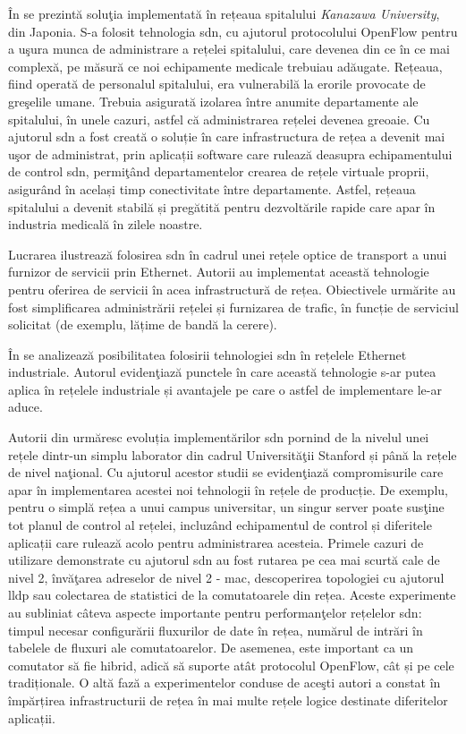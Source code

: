 În \cite{nec2012hospital} se prezintă soluţia implementată în rețeaua spitalului \textit{Kanazawa University}, din Japonia. S-a folosit tehnologia \gls{sdn}, cu ajutorul protocolului OpenFlow pentru a uşura munca de administrare a rețelei spitalului, care devenea din ce în ce mai complexă, pe măsură ce noi echipamente medicale trebuiau adăugate. Rețeaua, fiind operată de personalul spitalului, era vulnerabilă la erorile provocate de greşelile umane. Trebuia asigurată izolarea între anumite departamente ale spitalului, în unele cazuri, astfel că administrarea rețelei devenea greoaie. Cu ajutorul \gls{sdn} a fost creată o soluție în care infrastructura de rețea a devenit mai uşor de administrat, prin aplicații software care rulează deasupra echipamentului de control \gls{sdn}, permiţând departamentelor crearea de rețele virtuale proprii, asigurând în același timp conectivitate între departamente. Astfel, rețeaua spitalului a devenit stabilă și pregătită pentru dezvoltările rapide care apar în industria medicală în zilele noastre.

Lucrarea \cite{bidkar2014field} ilustrează folosirea \gls{sdn} în cadrul unei rețele optice de transport a unui furnizor de servicii prin Ethernet. Autorii au implementat această tehnologie pentru oferirea de servicii în acea infrastructură de rețea. Obiectivele urmărite au fost simplificarea administrării rețelei și furnizarea de trafic, în funcție de serviciul solicitat (de exemplu, lățime de bandă la cerere).

În \cite{kalman2014applicability} se analizează posibilitatea folosirii tehnologiei \gls{sdn} în rețelele Ethernet industriale. Autorul evidenţiază punctele în care această tehnologie s-ar putea aplica în rețelele industriale și avantajele pe care o astfel de implementare le-ar aduce.

Autorii din \cite{kobayashi2014maturing} urmăresc evoluția implementărilor \gls{sdn} pornind de la nivelul unei rețele dintr-un simplu laborator din cadrul Universităţii Stanford și până la rețele de nivel naţional. Cu ajutorul acestor studii se evidenţiază compromisurile care apar în implementarea acestei noi tehnologii în rețele de producție. De exemplu, pentru o simplă rețea a unui campus universitar, un singur server poate susţine tot planul de control al rețelei, incluzând echipamentul de control și diferitele aplicații care rulează acolo pentru administrarea acesteia. Primele cazuri de utilizare demonstrate cu ajutorul \gls{sdn} au fost rutarea pe cea mai scurtă cale de nivel 2, învăţarea adreselor de nivel 2 - \gls{mac}, descoperirea topologiei cu ajutorul \gls{lldp} sau colectarea de statistici de la comutatoarele din rețea. Aceste experimente au subliniat câteva aspecte importante pentru performanţelor rețelelor \gls{sdn}: timpul necesar configurării fluxurilor de date în rețea, numărul de intrări în tabelele de fluxuri ale comutatoarelor. De asemenea, este important ca un comutator să fie hibrid, adică să suporte atât protocolul OpenFlow, cât și pe cele tradiționale. O altă fază a experimentelor conduse de aceşti autori a constat în împărțirea infrastructurii de rețea în mai multe rețele logice destinate diferitelor aplicații. 

